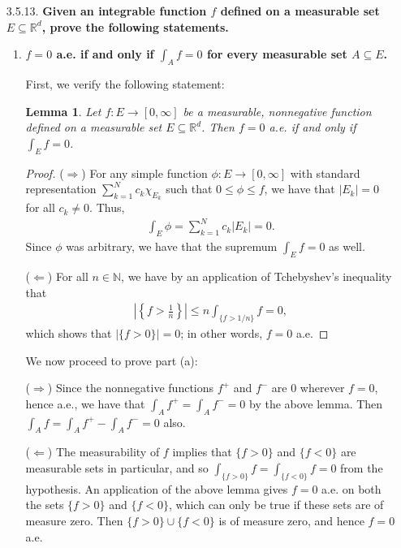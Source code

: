 \documentclass[a4paper,12pt]{article}
\newtheorem{lemma}[theorem]{Lemma}
\begin{document}
\begin{enumerate}
    \item[3.5.13.]
        \boldmath\textbf{Given an integrable function $f$ defined on a measurable set $E \subseteq \mathbb{R}^d$, prove the following statements.
        }\unboldmath \par
        \begin{enumerate}[label=(\alph*)]
            \item
                \boldmath\textbf{$f = 0$ a.e. if and only if $\int_A f = 0$ for every measurable set $A \subseteq E$.
                }\unboldmath \par
                First, we verify the following statement:
                \begin{lemma}
                    Let $f : E \to [0, \infty]$ be a measurable, nonnegative function defined on a measurable set $E \subseteq \mathbb{R}^d$. Then $f = 0$ a.e. if and only if $\int_E f = 0$.
                \end{lemma}
                \begin{proof}
                    ($\Rightarrow$) For any simple function $\phi : E \to [0, \infty]$ with standard representation $\sum_{k = 1}^N c_k \chi_{E_k}$ such that $0 \leq \phi \leq f$, we have that $|E_k| = 0$ for all $c_k \neq 0$. Thus,
                    \begin{align*}
                        \int_E \phi = \sum_{k = 1}^N c_k |E_k| = 0.
                    \end{align*}
                    Since $\phi$ was arbitrary, we have that the supremum $\int_E f = 0$ as well. \par
                    ($\Leftarrow$) For all $n \in \mathbb{N}$, we have by an application of Tchebyshev's inequality that
                    \begin{align*}
                        \left|\left\{ f > \frac{1}{n} \right\}\right| \leq n \int_{\{f > 1/n\}} f = 0,
                    \end{align*}
                    which shows that $|\{ f > 0 \}| = 0$; in other words, $f = 0$ a.e.
                \end{proof}
                We now proceed to prove part (a): \par
                ($\Rightarrow$) Since the nonnegative functions $f^+$ and $f^-$ are $0$ wherever $f = 0$, hence a.e., we have that $\int_A f^+ = \int_A f^- = 0$ by the above lemma. Then $\int_A f = \int_A f^+ - \int_A f^- = 0$ also. \par
                ($\Leftarrow$) %
                The measurability of $f$ implies that $\{ f > 0 \}$ and $\{ f < 0 \}$ are measurable sets in particular, and so $\int_{\{ f > 0 \}} f = \int_{\{ f < 0 \}} f = 0$ from the hypothesis. An application of the above lemma gives $f = 0$ a.e. on both the sets $\{ f > 0 \}$ and $\{ f < 0 \}$, which can only be true if these sets are of measure zero. Then $\{ f > 0 \} \cup \{ f < 0 \}$ is of measure zero, and hence $f = 0$ a.e.


\end{enumerate}
\end{enumerate}
\end{document}
